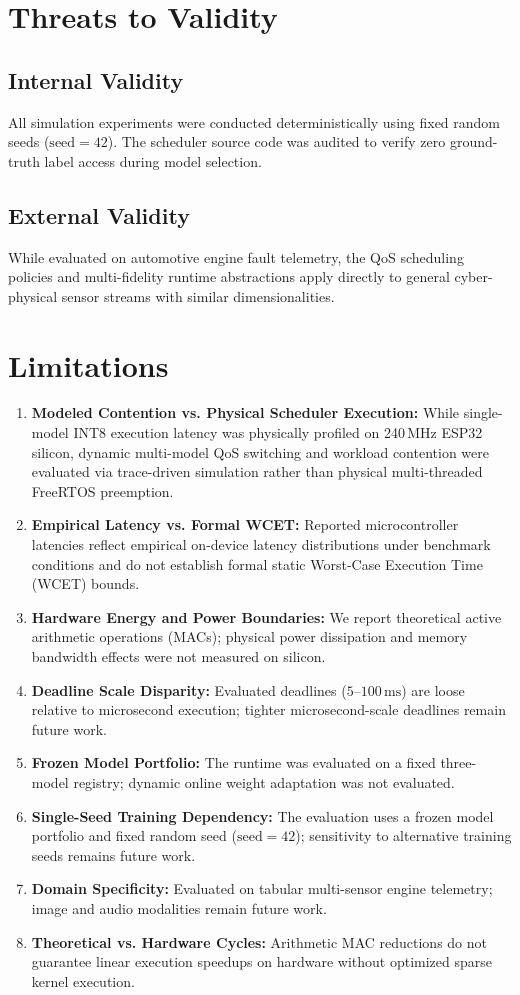 \documentclass[journal]{IEEEtran}
\begin{document}
\section{Threats to Validity}
\subsection{Internal Validity}
All simulation experiments were conducted deterministically using fixed random seeds ($\text{seed}=42$). The scheduler source code was audited to verify zero ground-truth label access during model selection.

\subsection{External Validity}
While evaluated on automotive engine fault telemetry, the QoS scheduling policies and multi-fidelity runtime abstractions apply directly to general cyber-physical sensor streams with similar dimensionalities.

\section{Limitations}
\begin{enumerate}
    \item \textbf{Modeled Contention vs. Physical Scheduler Execution:} While single-model INT8 execution latency was physically profiled on 240\,MHz ESP32 silicon, dynamic multi-model QoS switching and workload contention were evaluated via trace-driven simulation rather than physical multi-threaded FreeRTOS preemption.
    \item \textbf{Empirical Latency vs. Formal WCET:} Reported microcontroller latencies reflect empirical on-device latency distributions under benchmark conditions and do not establish formal static Worst-Case Execution Time (WCET) bounds.
    \item \textbf{Hardware Energy and Power Boundaries:} We report theoretical active arithmetic operations (MACs); physical power dissipation and memory bandwidth effects were not measured on silicon.
    \item \textbf{Deadline Scale Disparity:} Evaluated deadlines ($5$--$100\,\text{ms}$) are loose relative to microsecond execution; tighter microsecond-scale deadlines remain future work.
    \item \textbf{Frozen Model Portfolio:} The runtime was evaluated on a fixed three-model registry; dynamic online weight adaptation was not evaluated.
    \item \textbf{Single-Seed Training Dependency:} The evaluation uses a frozen model portfolio and fixed random seed ($\text{seed}=42$); sensitivity to alternative training seeds remains future work.
    \item \textbf{Domain Specificity:} Evaluated on tabular multi-sensor engine telemetry; image and audio modalities remain future work.
    \item \textbf{Theoretical vs. Hardware Cycles:} Arithmetic MAC reductions do not guarantee linear execution speedups on hardware without optimized sparse kernel execution.
\end{enumerate}
\end{document}
